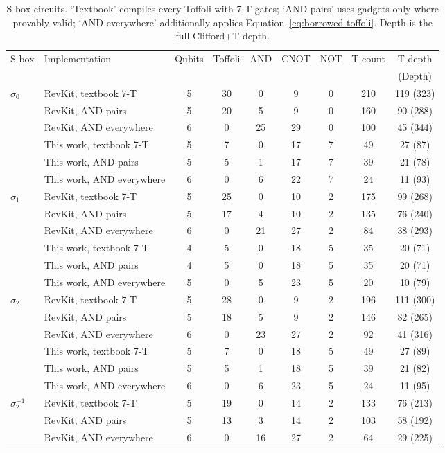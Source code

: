 \documentclass[runningheads,10pt]{llncs}
\begin{document}
\begin{table}[htbp]
\centering
\caption{S-box circuits. `Textbook' compiles every Toffoli with 7 T gates; `AND pairs' uses gadgets only where provably valid; `AND everywhere' additionally applies Equation~\eqref{eq:borrowed-toffoli}. Depth is the full Clifford+T depth.}
\label{tab:sbox-circuits}
\scriptsize
\begin{tabular}{llccccccc}
\toprule
S-box & Implementation & Qubits & Toffoli & AND & CNOT & NOT & T-count & T-depth \\
& & & & & & & & (Depth) \\
\midrule
\multirow{6}{*}{$\sigma_0$}
& RevKit, textbook 7-T & 5 & 30 & 0 & 9 & 0 & 210 & 119 (323) \\
& RevKit, AND pairs & 5 & 20 & 5 & 9 & 0 & 160 & 90 (288) \\
& RevKit, AND everywhere & 6 & 0 & 25 & 29 & 0 & 100 & 45 (344) \\
& This work, textbook 7-T & 5 & 7 & 0 & 17 & 7 & 49 & 27 (87) \\
& This work, AND pairs & 5 & 5 & 1 & 17 & 7 & 39 & 21 (78) \\
& This work, AND everywhere & 6 & 0 & 6 & 22 & 7 & 24 & 11 (93) \\
\midrule
\multirow{6}{*}{$\sigma_1$}
& RevKit, textbook 7-T & 5 & 25 & 0 & 10 & 2 & 175 & 99 (268) \\
& RevKit, AND pairs & 5 & 17 & 4 & 10 & 2 & 135 & 76 (240) \\
& RevKit, AND everywhere & 6 & 0 & 21 & 27 & 2 & 84 & 38 (293) \\
& This work, textbook 7-T & 4 & 5 & 0 & 18 & 5 & 35 & 20 (71) \\
& This work, AND pairs & 4 & 5 & 0 & 18 & 5 & 35 & 20 (71) \\
& This work, AND everywhere & 5 & 0 & 5 & 23 & 5 & 20 & 10 (79) \\
\midrule
\multirow{6}{*}{$\sigma_2$}
& RevKit, textbook 7-T & 5 & 28 & 0 & 9 & 2 & 196 & 111 (300) \\
& RevKit, AND pairs & 5 & 18 & 5 & 9 & 2 & 146 & 82 (265) \\
& RevKit, AND everywhere & 6 & 0 & 23 & 27 & 2 & 92 & 41 (316) \\
& This work, textbook 7-T & 5 & 7 & 0 & 18 & 5 & 49 & 27 (89) \\
& This work, AND pairs & 5 & 5 & 1 & 18 & 5 & 39 & 21 (82) \\
& This work, AND everywhere & 6 & 0 & 6 & 23 & 5 & 24 & 11 (95) \\
\midrule
\multirow{3}{*}{$\sigma_2^{-1}$}
& RevKit, textbook 7-T & 5 & 19 & 0 & 14 & 2 & 133 & 76 (213) \\
& RevKit, AND pairs & 5 & 13 & 3 & 14 & 2 & 103 & 58 (192) \\
& RevKit, AND everywhere & 6 & 0 & 16 & 27 & 2 & 64 & 29 (225) \\
\bottomrule
\end{tabular}
\end{table}
\end{document}
